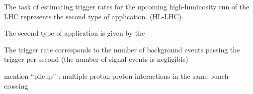 The task of estimating trigger rates for the upcoming high-luminosity run of the LHC represents the second type of application.
 (HL-LHC).

The second type of application is given by the


The trigger rate corresponds to the number of background events passing the trigger per second (the number of signal events is negligible)

mention ``pileup'' : multiple proton-proton interactions in the same bunch-crossing




